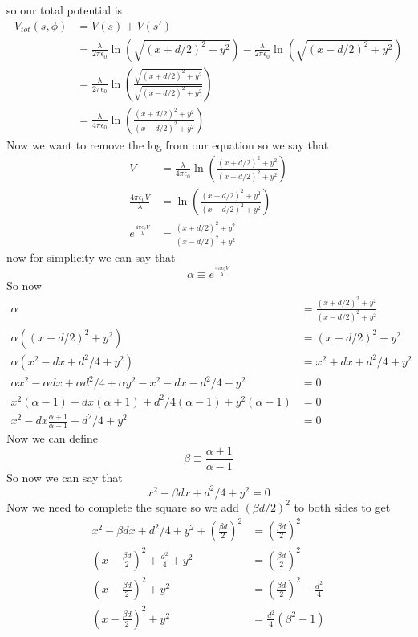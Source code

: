 \documentclass[11pt]{article}
\numberwithin{equation}{section}
\begin{document}
\begin{enumerate}[(a)]
so our total potential is
\begin{align*}
V_{tot}(s,\phi) &= V(s) + V(s')\\
&= \frac{\lambda}{2\pi \epsilon_0 }\ln\left(\sqrt{(x+d/2)^2+y^2}\right) -\frac{\lambda}{2\pi \epsilon_0 }\ln\left(\sqrt{(x-d/2)^2+y^2}\right)\\
&= \frac{\lambda}{2\pi \epsilon_0 }\ln\left(\frac{\sqrt{(x+d/2)^2+y^2}}{\sqrt{(x-d/2)^2+y^2}}\right)\\
&= \frac{\lambda}{4\pi \epsilon_0 }\ln\left(\frac{(x+d/2)^2+y^2}{(x-d/2)^2+y^2}\right)
\end{align*}
Now we want to remove the log from our equation so we say that
\begin{align*}
V &= \frac{\lambda}{4\pi \epsilon_0 }\ln\left(\frac{(x+d/2)^2+y^2}{(x-d/2)^2+y^2}\right) \\
\frac{4\pi\epsilon_0V}{\lambda} &= \ln\left(\frac{(x+d/2)^2+y^2}{(x-d/2)^2+y^2}\right) \\
e^{\frac{4\pi\epsilon_0V}{\lambda}} &= \frac{(x+d/2)^2+y^2}{(x-d/2)^2+y^2}
\end{align*}
now for simplicity we can say that
$$\alpha\equiv e^{\frac{4\pi\epsilon_0V}{\lambda}}$$ 
So now 
\begin{align*}
\alpha &= \frac{(x+d/2)^2+y^2}{(x-d/2)^2+y^2}\\
\alpha\left((x-d/2)^2+y^2\right) &= (x+d/2)^2+y^2\\
\alpha\left(x^2-dx+d^2/4+y^2\right) &= x^2+dx+d^2/4+y^2\\
\alpha x^2-\alpha dx+\alpha d^2/4+\alpha y^2 - x^2-dx-d^2/4-y^2 &= 0\\
x^2(\alpha-1) -dx(\alpha+1)+d^2/4(\alpha-1)+y^2(\alpha-1) &= 0\\
x^2 -dx\frac{\alpha+1}{\alpha-1} +d^2/4+y^2 &= 0
\end{align*}
Now we can define 
$$\beta \equiv \frac{\alpha+1}{\alpha-1}$$
So now we can say that
$$x^2 -\beta dx+d^2/4+y^2 = 0$$
Now we need to complete the square so we add $(\beta d/2)^2$ to both sides to get
\begin{align*}
x^2 -\beta dx+d^2/4+y^2 + \left(\frac{\beta d}{2}\right)^2 &= \left(\frac{\beta d}{2}\right)^2 \\ 
\left(x-\frac{\beta d}{2}\right)^2 +\frac{d^2}{4} +y^2  &= \left(\frac{\beta d}{2}\right)^2 \\ 
\left(x-\frac{\beta d}{2}\right)^2 +y^2  &= \left(\frac{\beta d}{2}\right)^2-\frac{d^2}{4}  \\ 
\left(x-\frac{\beta d}{2}\right)^2 +y^2  &= \frac{d^2}{4}\left(\beta^2-1\right) 

\end{align*}
\end{enumerate}
\end{document}
